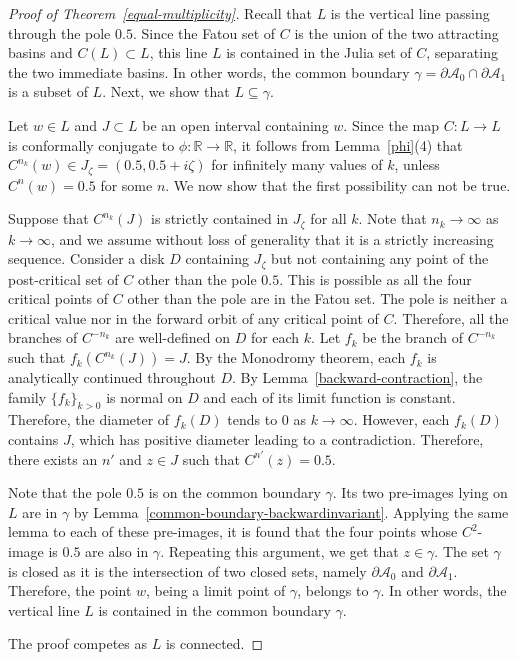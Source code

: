 \documentclass[12pt]{article}
\begin{document}
 
\begin{proof}[Proof of Theorem~\ref{equal-multiplicity}]Recall that $L$ is the vertical line passing through the pole $0.5$.	
	Since the Fatou set of $C$ is the union of the two attracting basins and $C (L) \subset L$, this line $L$ is contained in the Julia set of $C$, separating the two immediate basins.
	In other words, the common boundary $\gamma  = \partial \mathcal{A}_0 \cap    \partial \mathcal{A}_1$  is a subset of $L$. Next, we  show that $L \subseteq \gamma$.
	\par 
	
Let  $w \in L$ and  $J \subset L$ be an open interval containing $w$. Since the map $C : L \to L$ is conformally conjugate to $\phi: \mathbb{R} \to \mathbb{R}$, it follows from Lemma~\ref{phi}(4) that   $C ^{n_k} (w) \in J_\zeta=(0.5, 0.5+i \zeta)$ for infinitely many values of $k$, unless $C^n (w)=0.5$ for some $n$.
We now show that the first possibility can not be true.

\par   Suppose that $C ^{n_k} (J)$ is strictly contained in $J_\zeta$ for all $k$. Note that $n_k \to \infty$ as $k \to \infty$, and we assume without loss of   generality that it is a strictly increasing sequence. Consider a disk $D$ containing $J_\zeta$ but not containing any point of the post-critical set of $C $ other than the pole $0.5$. This is possible as all the four critical points of $C $ other than the pole are in the Fatou set. The pole is neither a critical value nor in the forward orbit of any critical point of $C$. Therefore, all the branches of  $C ^{-n_k}$ are well-defined on $D$ for each $k$. Let $f_k$ be the branch of $C ^{-n_k}$ such that $f_k ( C ^{n_k} (J) )=J$. By the Monodromy theorem, each $f_k$ is analytically continued throughout $D$. 
	By Lemma~\ref{backward-contraction}, the family $\{f_k\}_{k>0}$ is normal on $D$ and each of its limit function is constant. Therefore, the diameter of $f_k (D)$ tends to $0$ as $k \to \infty$. However, each $f_k(D)$ contains $J$, which has positive diameter leading to a contradiction. Therefore,  there exists an $n'$ and $ z \in J$ such that $C^{n'}(z)=0.5$.
\par Note that the pole $0.5$ is on the common boundary  $\gamma$. Its two pre-images lying on $L$ are in $\gamma$ by Lemma~\ref{common-boundary-backwardinvariant}.
Applying the same lemma  to each of these pre-images, it is found that the four points whose $C^2$-image is $0.5$ are also in $\gamma$. Repeating this argument, we get that  $ z \in \gamma$. The set $\gamma$ is closed as it is the intersection of two closed sets, namely $\partial \mathcal{A}_0$ and $\partial \mathcal{A}_1$. Therefore, the point $w$, being a limit point of $\gamma$, belongs to $\gamma$. In other words, the vertical line $L$ is contained in the common boundary  $\gamma$.

\par The proof competes as $L$ is  connected.

\end{proof}
\end{document}
